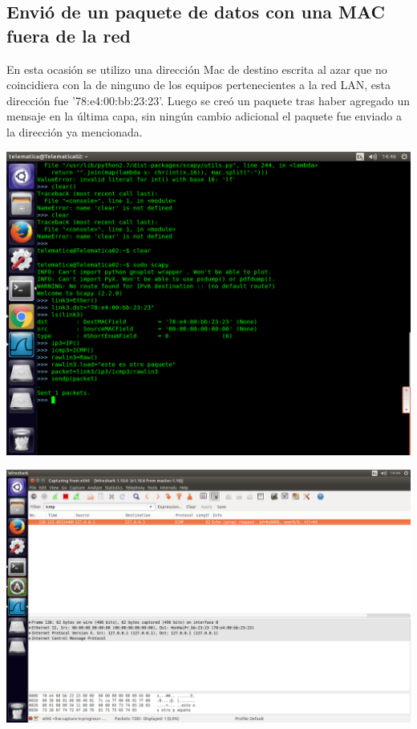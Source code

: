 ﻿\documentclass[spanish]{udpreport}
\begin{document}
\subsection{Envió de un paquete de datos con una MAC fuera de la red}

En esta ocasión se utilizo una dirección Mac de destino escrita al azar que no coincidiera con la de ninguno de los equipos pertenecientes a la red LAN, esta dirección fue ’78:e4:00:bb:23:23’. Luego se creó un paquete tras haber agregado un mensaje en la última capa, sin ningún cambio adicional el paquete fue enviado a la dirección ya mencionada.


\begin{center}
	\includegraphics[scale=.37]{imagenes/Switch/Test_3.png}
\end{center}



\begin{center}
	\includegraphics[scale=.37]{imagenes/Switch/Test_3_Wireshark.png}
\end{center}
\end{document}
